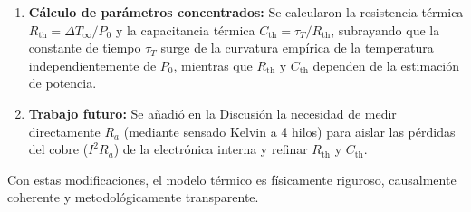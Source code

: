 \documentclass{LabDSTresponse}
\begin{document}
{\begin{enumerate}
    \item \textbf{Cálculo de parámetros concentrados:} Se calcularon la resistencia térmica $R_{\text{th}} = \Delta T_\infty / P_0$ y la capacitancia térmica $C_{\text{th}} = \tau_T / R_{\text{th}}$, subrayando que la constante de tiempo $\tau_T$ surge de la curvatura empírica de la temperatura independientemente de $P_0$, mientras que $R_{\text{th}}$ y $C_{\text{th}}$ dependen de la estimación de potencia.
    \item \textbf{Trabajo futuro:} Se añadió en la Discusión la necesidad de medir directamente $R_a$ (mediante sensado Kelvin a 4 hilos) para aislar las pérdidas del cobre ($I^2 R_a$) de la electrónica interna y refinar $R_{\text{th}}$ y $C_{\text{th}}$.
\end{enumerate}
Con estas modificaciones, el modelo térmico es físicamente riguroso, causalmente coherente y metodológicamente transparente.}
\end{document}
